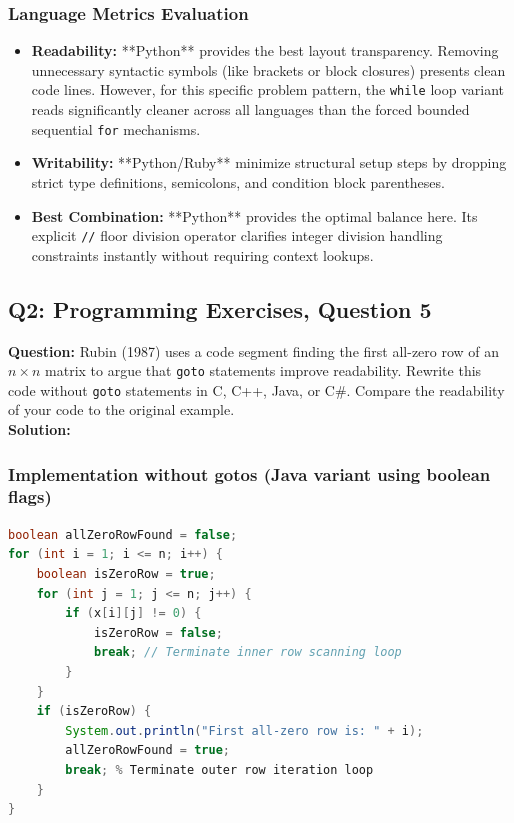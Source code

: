 \documentclass[11pt]{article}
\begin{document}
\subsubsection*{Language Metrics Evaluation}
\begin{itemize}
    \item \textbf{Readability:} **Python** provides the best layout transparency. Removing unnecessary syntactic symbols (like brackets or block closures) presents clean code lines. However, for this specific problem pattern, the \texttt{while} loop variant reads significantly cleaner across all languages than the forced bounded sequential \texttt{for} mechanisms.
    \item \textbf{Writability:} **Python/Ruby** minimize structural setup steps by dropping strict type definitions, semicolons, and condition block parentheses.
    \item \textbf{Best Combination:} **Python** provides the optimal balance here. Its explicit \texttt{//} floor division operator clarifies integer division handling constraints instantly without requiring context lookups.
\end{itemize}

\subsection{Q2: Programming Exercises, Question 5}
\textbf{Question:} Rubin (1987) uses a code segment finding the first all-zero row of an $n \times n$ matrix to argue that \texttt{goto} statements improve readability. Rewrite this code without \texttt{goto} statements in C, C++, Java, or C\#. Compare the readability of your code to the original example.\\

\noindent\textbf{Solution:}

\subsubsection*{Implementation without gotos (Java variant using boolean flags)}
\begin{lstlisting}[language=Java]
boolean allZeroRowFound = false;
for (int i = 1; i <= n; i++) {
    boolean isZeroRow = true;
    for (int j = 1; j <= n; j++) {
        if (x[i][j] != 0) {
            isZeroRow = false;
            break; // Terminate inner row scanning loop
        }
    }
    if (isZeroRow) {
        System.out.println("First all-zero row is: " + i);
        allZeroRowFound = true;
        break; % Terminate outer row iteration loop
    }
}
\end{lstlisting}
\end{document}

